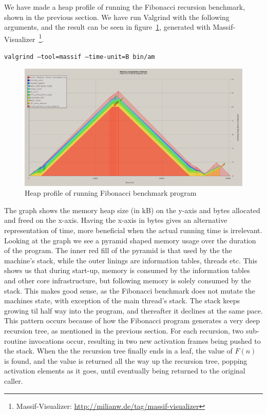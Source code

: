 We have made a heap profile of \thename{} running the Fibonacci recursion
benchmark, shown in the previous section. We have run Valgrind with the
following arguments, and the result can be seen in
figure~\ref{fig:heap-profile}, generated with
Massif-Visualizer~\footnote{Massif-Visualizer:
  \url{http://milianw.de/tag/massif-visualizer}}.

{\tt valgrind --tool=massif --time-unit=B bin/am}

\begin{figure}[H]
  \centering
  \includegraphics[scale=0.35]{figures/fig-mem}
  \caption{Heap profile of \thename{} running Fibonacci benchmark program}
\label{fig:heap-profile}
\end{figure}

The graph shows the memory heap size (in kB) on the y-axis and bytes allocated
and freed on the x-axis. Having the x-axis in bytes gives an alternative
representation of time, more beneficial when the actual running time is
irrelevant. Looking at the graph we see a pyramid shaped memory usage over the
duration of the program. The inner red fill of the pyramid is that used by the
the machine's stack, while the outer linings are information tables, threads
etc. This shows us that during start-up, memory is consumed by the information
tables and other core infrastructure, but following memory is solely consumed by
the stack. This makes good sense, as the Fibonacci benchmark does not mutate the
machines state, with exception of the main thread's stack. The stack keeps
growing til half way into the program, and thereafter it declines at the same
pace. This pattern occurs because of how the Fibonacci program generates a very
deep recursion tree, as mentioned in the previous section. For each recursion,
two sub-routine invocations occur, resulting in two new activation frames being
pushed to the stack. When the the recursion tree finally ends in a leaf, the
value of $F(n)$ is found, and the value is returned all the way up the recursion
tree, popping activation elements as it goes, until eventually being returned to
the original caller.

